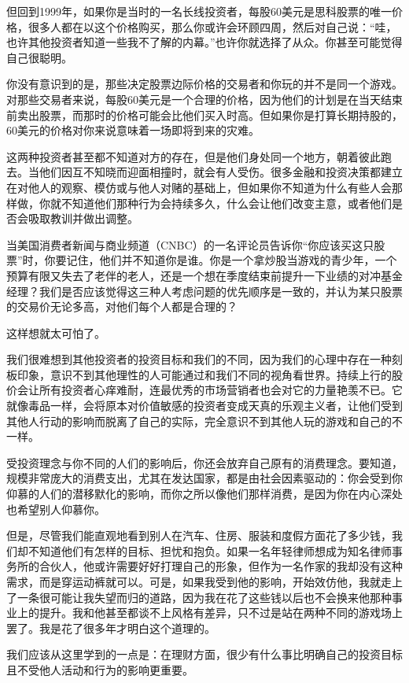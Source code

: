 但回到1999年，如果你是当时的一名长线投资者，每股60美元是思科股票的唯一价格，很多人都在以这个价格购买，那么你或许会环顾四周，然后对自己说：“哇，也许其他投资者知道一些我不了解的内幕。”也许你就选择了从众。你甚至可能觉得自己很聪明。

你没有意识到的是，那些决定股票边际价格的交易者和你玩的并不是同一个游戏。对那些交易者来说，每股60美元是一个合理的价格，因为他们的计划是在当天结束前卖出股票，而那时的价格可能会比他们买入时高。但如果你是打算长期持股的，60美元的价格对你来说意味着一场即将到来的灾难。

这两种投资者甚至都不知道对方的存在，但是他们身处同一个地方，朝着彼此跑去。当他们因互不知晓而迎面相撞时，就会有人受伤。很多金融和投资决策都建立在对他人的观察、模仿或与他人对赌的基础上，但如果你不知道为什么有些人会那样做，你就不知道他们那种行为会持续多久，什么会让他们改变主意，或者他们是否会吸取教训并做出调整。

当美国消费者新闻与商业频道（CNBC）的一名评论员告诉你“你应该买这只股票”时，你要记住，他们并不知道你是谁。你是一个拿炒股当游戏的青少年，一个预算有限又失去了老伴的老人，还是一个想在季度结束前提升一下业绩的对冲基金经理？我们是否应该觉得这三种人考虑问题的优先顺序是一致的，并认为某只股票的交易价无论多高，对他们每个人都是合理的？

这样想就太可怕了。

我们很难想到其他投资者的投资目标和我们的不同，因为我们的心理中存在一种刻板印象，意识不到其他理性的人可能通过和我们不同的视角看世界。持续上行的股价会让所有投资者心痒难耐，连最优秀的市场营销者也会对它的力量艳羡不已。它就像毒品一样，会将原本对价值敏感的投资者变成天真的乐观主义者，让他们受到其他人行动的影响而脱离了自己的实际，完全意识不到其他人玩的游戏和自己的不一样。

受投资理念与你不同的人们的影响后，你还会放弃自己原有的消费理念。要知道，规模非常庞大的消费支出，尤其在发达国家，都是由社会因素驱动的：你会受到你仰慕的人们的潜移默化的影响，而你之所以像他们那样消费，是因为你在内心深处也希望别人仰慕你。

但是，尽管我们能直观地看到别人在汽车、住房、服装和度假方面花了多少钱，我们却不知道他们有怎样的目标、担忧和抱负。如果一名年轻律师想成为知名律师事务所的合伙人，他或许需要好好打理自己的形象，但作为一名作家的我却没有这种需求，而是穿运动裤就可以。可是，如果我受到他的影响，开始效仿他，我就走上了一条很可能让我失望而归的道路，因为我在花了这些钱以后也不会换来他那种事业上的提升。我和他甚至都谈不上风格有差异，只不过是站在两种不同的游戏场上罢了。我是花了很多年才明白这个道理的。

我们应该从这里学到的一点是：在理财方面，很少有什么事比明确自己的投资目标且不受他人活动和行为的影响更重要。

